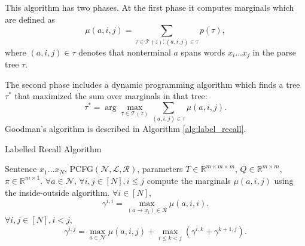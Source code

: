 \documentclass[conference]{IEEEtran}
\newcommand{\R}{\mathbb{R}}
\begin{document}
This algorithm has two phases. At the first phase it computes marginals which are defined as 
$$ \mu(a, i, j) = \sum_{\tau \in \mathcal{T}(z): (a, i, j) \in \tau} p(\tau),$$
where $(a, i, j) \in \tau$ denotes that nonterminal $a$ spans words $x_i\dots x_j$ in the parse tree $\tau$.

The second phase includes a dynamic programming algorithm which finds a tree $\tau^*$ that maximized the sum over marginals in that tree:
$$ \tau^* = \arg\max_{\tau\in \mathcal{T}(z)} \sum_{(a,i,j)\in \tau} \mu(a,i,j).$$
Goodman’s algorithm is described in Algorithm \ref{alg:label_recall}. 

\begin{algorithm}[h!]
   \caption{Labelled Recall Algorithm}
   \label{alg:label_recall}
\begin{algorithmic}
     Sentence $x_1 \dots x_N$,     PCFG$(\mathcal{N},\mathcal{L, R})$, parameters $T \in \R^{m\times m\times m}$, $Q \in \R^{m\times m}$, $\pi \in \R^{m\times1}$.
     $\forall a \in \mathcal{N}$, $\forall i, j\in [N], i \leq j$ compute the marginals $\mu(a,i,j)$ using the inside-outside algorithm.
     $\forall i \in [N]$,
    $$\gamma^{i,i} = \max_{(a\to x_i)\in\mathcal{R}} \mu(a,i,i).$$
     $\forall i,j \in [N], i < j,$
    $$\gamma^{i,j} = \max_{a\in \mathcal{N}}\mu(a,i,j) + \max_{i\leq k < j}(\gamma^{i,k} + \gamma^{k+1, j}).$$
\end{algorithmic}
\end{algorithm}
\end{document}
